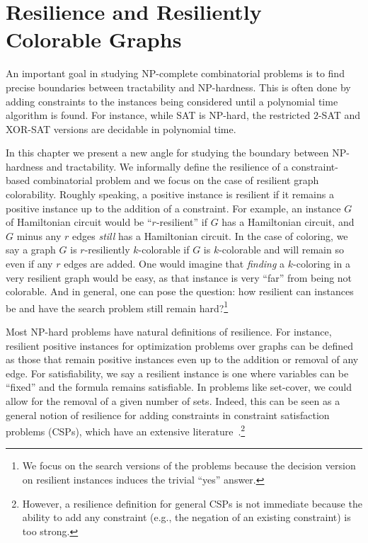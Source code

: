 \chapter{Resilience and Resiliently Colorable Graphs}
\label{ch:resilience}

An important goal in studying NP-complete combinatorial problems is to find
precise boundaries between tractability and NP-hardness. This is often done by
adding constraints to the instances being considered until a polynomial time
algorithm is found.  For instance, while SAT is NP-hard, the restricted
$2$-SAT and XOR-SAT versions are decidable in polynomial time.  

In this chapter we present a new angle for studying the boundary between
NP-hardness and tractability.  We informally define the resilience of a
constraint-based combinatorial problem and we focus on the case of resilient
graph colorability. Roughly speaking, a positive instance is resilient if it
remains a positive instance up to the addition of a constraint. For example, an
instance $G$ of Hamiltonian circuit would be ``$r$-resilient'' if $G$ has a
Hamiltonian circuit, and $G$ minus any $r$ edges \emph{still} has a Hamiltonian
circuit. In the case of coloring, we say a graph $G$ is $r$-resiliently
$k$-colorable if $G$ is $k$-colorable and will remain so even if any $r$ edges
are added. One would imagine that \emph{finding} a $k$-coloring in a very
resilient graph would be easy, as that instance is very ``far'' from being not
colorable.  And in general, one can pose the question: how resilient can
instances be and have the search problem still remain hard?\footnote{We focus
on the search versions of the problems because the decision version on
resilient instances induces the trivial ``yes'' answer.}

Most NP-hard problems have natural definitions of resilience.  For instance,
resilient positive instances for optimization problems over graphs can be
defined as those that remain positive instances even up to the addition or
removal of any edge.  For satisfiability, we say a resilient instance is one
where variables can be ``fixed'' and the formula remains satisfiable. In
problems like set-cover, we could allow for the removal of a given number of
sets. Indeed, this can be seen as a general notion of resilience for adding
constraints in constraint satisfaction problems (CSPs), which have an extensive
literature~\cite{Kumar92}.\footnote{However, a resilience definition for
general CSPs is not immediate because the ability to add any constraint (e.g.,
the negation of an existing constraint) is too strong.}

